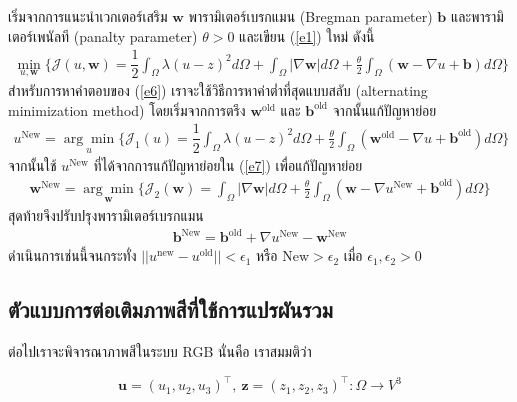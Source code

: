 \documentclass[hidelinks, a4paper,12pt]{article}
\numberwithin{equation}{section}							%
\numberwithin{equation}{section}
\begin{document}
{\begin{itemize}
	เริ่มจากการแนะนำเวกเตอร์เสริม $\boldsymbol{w}$ พารามิเตอร์เบรกแมน (Bregman parameter) $\boldsymbol{b}$ และพารามิเตอร์เพนัลที (panalty parameter) $\theta>0$ และเขียน (\ref{e1}) ใหม่ ดังนี้
	\begin{align}
	\min_{u,\boldsymbol{w}} \{ \mathcal{J}(u,\boldsymbol{w}) = \dfrac{1}{2} \int_{\Omega} \lambda(u-z)^2 d\Omega +  \int_{\Omega}  |\nabla \boldsymbol{w}|  d\Omega + \frac{\theta}{2} \int_{\Omega} (\boldsymbol{w} - \nabla u + \boldsymbol{b}) d\Omega \}
	\label{e6}
	\end{align}
	สำหรับการหาคำตอบของ (\ref{e6}) เราจะใช้วิธีการหาค่าต่ำที่สุดแบบสลับ (alternating minimization method) โดยเริ่มจากการตรึง $\boldsymbol{w}^{\text{old}}$ และ $\boldsymbol{b}^{\text{old}}$ จากนั้นแก้ปัญหาย่อย
	\begin{align}
	u^{\text{New}}=\underset{u}{\arg\min} \{ \mathcal{J}_1(u) = \dfrac{1}{2} \int_{\Omega} \lambda(u-z)^2 d\Omega + \frac{\theta}{2} \int_{\Omega} (\boldsymbol{w}^{\text{old}} - \nabla u + \boldsymbol{b}^{\text{old}}) d\Omega \}
	\label{e7}
	\end{align}
	จากนั้นใช้ $u^{\text{New}}$ ที่ได้จากการแก้ปัญหาย่อยใน (\ref{e7}) เพื่อแก้ปัญหาย่อย
	\begin{align}
	\boldsymbol{w}^{\text{New}}=\underset{\boldsymbol{w}}{\arg\min} \{ \mathcal{J}_2(\boldsymbol{w}) = \int_{\Omega}  |\nabla \boldsymbol{w}|  d\Omega  + \frac{\theta}{2} \int_{\Omega} (\boldsymbol{w} - \nabla u^{\text{New}} + \boldsymbol{b}^{\text{old}}) d\Omega \}
	\label{e8}
	\end{align}
	สุดท้ายจึงปรับปรุงพารามิเตอร์เบรกแมน 
	\begin{align}
	\boldsymbol{b}^{\text{New}}=\boldsymbol{b}^{\text{old}}+\nabla u^{\text{New}}-\boldsymbol{w}^{\text{New}}
	\label{e9}
	\end{align}
	ดำเนินการเช่นนี้จนกระทั่ง $||u^{\text{new}}-u^{\text{old}}||< \epsilon_1$ หรือ $\text{New}>\epsilon_2$ เมื่อ $\epsilon_1,\epsilon_2>0$ 
\end{itemize}

\subsection{ตัวแบบการต่อเติมภาพสีที่ใช้การแปรผันรวม}\label{inpaint-model-color}

\hspace{1cm} ต่อไปเราจะพิจารณาภาพสีในระบบ RGB นั่นคือ เราสมมติว่า

$$ \boldsymbol{u} = (u_1,u_2,u_3)^{\top},\ \boldsymbol{z} = (z_1,z_2,z_3)^{\top} : \Omega  \rightarrow V^3 $$

}
\end{document}
